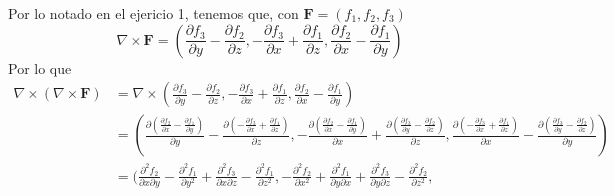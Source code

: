 \documentclass{article}
\begin{document}
\begin{enumerate}
{\begin{enumerate}
{           \color{azul}
                Por lo notado en el ejericio 1, tenemos que, con
                $\mathbf{F}=(f_1, f_2, f_3)$
                \[
                \nabla \times \mathbf{F} =
                (
                \frac{\partial f_3}{\partial y}
                - \frac{\partial f_2}{\partial z},
                -\frac{\partial f_3}{\partial x}
                +\frac{\partial f_1}{\partial z},
                \frac{\partial f_2}{\partial x}
                -\frac{\partial f_1}{\partial y}
                )
                \]
                Por lo que
                \begin{align*}
                    \nabla \times (\nabla \times \mathbf{F})
                    &= \nabla \times
                    (
                    \frac{\partial f_3}{\partial y}
                    - \frac{\partial f_2}{\partial z},
                    -\frac{\partial f_3}{\partial x}
                    +\frac{\partial f_1}{\partial z},
                    \frac{\partial f_2}{\partial x}
                    -\frac{\partial f_1}{\partial y}
                    )\\
                    &=
                    (
                    \frac{\partial (\frac{\partial f_2}{\partial x}
                    -\frac{\partial f_1}{\partial y})}{\partial y}
                    - \frac{\partial (-\frac{\partial f_3}{\partial x}
                    +\frac{\partial f_1}{\partial z})}{\partial z},
                    -\frac{\partial (\frac{\partial f_2}{\partial x}
                    -\frac{\partial f_1}{\partial y})}{\partial x}
                    +\frac{\partial (\frac{\partial f_3}{\partial y}
                    - \frac{\partial f_2}{\partial z})}{\partial z},
                    \frac{\partial (-\frac{\partial f_3}{\partial x}
                    +\frac{\partial f_1}{\partial z})}{\partial x}
                    -\frac{\partial (\frac{\partial f_3}{\partial y}
                    - \frac{\partial f_2}{\partial z})}{\partial y}
                    )\\
                    &=
                    (
                    \frac{\partial^2f_2}{\partial x \partial y}
                    -\frac{\partial^2f_1}{\partial y^2}
                    +\frac{\partial^2f_3}{\partial x \partial z}
                    -\frac{\partial^2f_1}{\partial z^2},
                    -\frac{\partial^2f_2}{\partial x^2}
                    +\frac{\partial^2f_1}{\partial y \partial x}
                    +\frac{\partial^2f_3}{\partial y \partial z}
                    -\frac{\partial^2f_2}{\partial z^2},

\end{align*}}
\end{enumerate}}
\end{enumerate}
\end{document}
